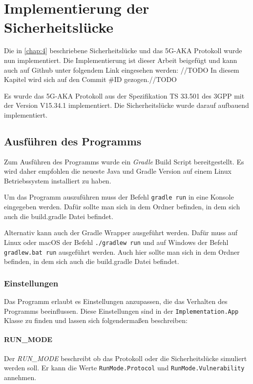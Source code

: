 \chapter{Implementierung der Sicherheitsl\"ucke}
\label{chap:5}

Die in \cref{chap:4} beschriebene Sicherheitslücke und das 5G-AKA Protokoll wurde nun implementiert.
Die Implementierung ist dieser Arbeit beigefügt und kann auch auf Github unter folgendem Link eingesehen werden: \url{}//TODO
In diesem Kapitel wird sich auf den Commit \#ID gezogen.//TODO

Es wurde das 5G-AKA Protokoll aus der Spezifikation TS 33.501 des 3GPP mit der Version V15.34.1 implementiert.
Die Sicherheitslücke wurde darauf aufbauend implementiert.


\section{Ausführen des Programms}
Zum Ausführen des Programms wurde ein \textit{Gradle} Build Script bereitgestellt.
Es wird daher empfohlen die neueste Java und Gradle Version auf einem Linux Betriebssystem installiert zu haben.

Um das Programm auszuführen muss der Befehl \lstinline{gradle run} in eine Konsole eingegeben werden.
Dafür sollte man sich in dem Ordner befinden, in dem sich auch die build.gradle Datei befindet.

Alternativ kann auch der Gradle Wrapper ausgeführt werden.
Dafür muss auf Linux oder macOS der Befehl \lstinline{./gradlew run} und auf Windows der Befehl \lstinline{gradlew.bat run} ausgeführt werden.
Auch hier sollte man sich in dem Ordner befinden, in dem sich auch die build.gradle Datei befindet.

\subsection{Einstellungen}

Das Programm erlaubt es Einstellungen anzupassen, die das Verhalten des Programms beeinflussen.
Diese Einstellungen sind in der \lstinline{Implementation.App} Klasse zu finden und lassen sich folgendermaßen beschreiben:

\subsubsection{RUN\_MODE}
Der \textit{RUN\_MODE} beschreibt ob das Protokoll oder die Sicherheitslücke simuliert werden soll.
Er kann die Werte \lstinline{RunMode.Protocol} und \lstinline{RunMode.Vulnerability} annehmen.

